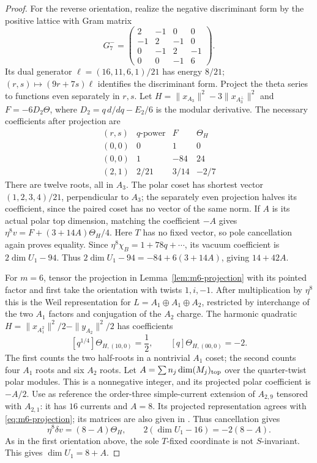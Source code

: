 \begin{proof}
For the reverse orientation, realize the negative discriminant form
by the positive lattice with Gram matrix
\[
 G_7^-=
 \begin{pmatrix}2&-1&0&0\\-1&2&-1&0\\
 0&-1&2&-1\\0&0&-1&6\end{pmatrix}.
\]
Its dual generator $\ell=(16,11,6,1)/21$ has energy $8/21$;
$(r,s)\mapsto(9r+7s)\ell$ identifies the discriminant form.
Project the theta series to functions even separately in $r,s$.
Let $H=\|x_{A_3}\|^2-3\|x_{A_3^\perp}\|^2$ and
$F=-6D_2\Theta$, where $D_2=q\,d/dq-E_2/6$ is the modular derivative.
The necessary coefficients after projection are
\[
\begin{array}{c|c|r|r}
 (r,s)&q\text{-power}&F&\Theta_H\\\hline
 (0,0)&0&1&0\\
 (0,0)&1&-84&24\\
 (2,1)&2/21&3/14&-2/7
\end{array}
\]
There are twelve roots, all in $A_3$. The polar coset has shortest
vector $(1,2,3,4)/21$, perpendicular to $A_3$; the separately even
projection halves its coefficient, since the paired coset has no
vector of the same norm. If $A$ is its actual polar top dimension,
matching the coefficient $-A$ gives
$\eta^8v=F+(3+14A)\Theta_H/4$. Here $T$ has no fixed vector, so
pole cancellation again proves equality. Since
$\eta^8\chi_B=1+78q+\cdots$, its vacuum coefficient is
$2\dim U_1-94$. Thus
$2\dim U_1-94=-84+6(3+14A)$, giving $14+42A$.

For $m=6$, tensor the projection in
Lemma~\ref{lem:m6-projection} with its pointed factor and first take
the orientation with twists $1,i,-1$. After multiplication by
$\eta^8$ this is the Weil representation for
$L=A_1\oplus A_1\oplus A_2$, restricted by interchange of the two
$A_1$ factors and conjugation of the $A_2$ charge.
The harmonic quadratic
$H=\|x_{A_1^2}\|^2/2-\|y_{A_2}\|^2/2$ has coefficients
\[
 [q^{1/4}]\Theta_{H,(10,0)}=\frac12,
 \qquad [q]\Theta_{H,(00,0)}=-2.
\]
The first counts the two half-roots in a nontrivial $A_1$ coset;
the second counts four $A_1$ roots and six $A_2$ roots.
Let $A=\sum n_j\dim(M_j)_{\rm top}$ over the quarter-twist polar
modules. This is a nonnegative integer, and its projected polar
coefficient is $-A/2$. Use as reference the order-three simple-current
extension of $A_{2,9}$ tensored with $A_{2,1}$: it has $16$ currents
and $A=8$. Its projected representation agrees with
\eqref{eq:m6-projection}; its matrices are also given in
\cite[Lemma~3.4 and Proposition~3.5]{Yu}. Thus cancellation gives
\[
 \eta^8\delta v=(8-A)\Theta_H,
 \qquad 2(\dim U_1-16)=-2(8-A).
\]
As in the first orientation above, the sole $T$-fixed coordinate is
not $S$-invariant. This gives $\dim U_1=8+A$.


\end{proof}
